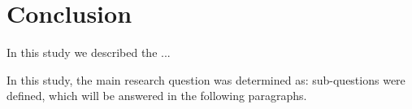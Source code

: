 \chapter{Conclusion}
\label{chap:conclusion}
In this study we described the ...

In this study, the main research question was determined as: \myMainRQ
sub-questions were defined, which will be answered in the following paragraphs.

















